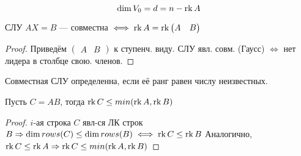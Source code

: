 \begin{consequence}
\[
\dim V_0 = d = n - \operatorname{rk} A
\]
\end{consequence}
\begin{theorem}
  СЛУ $AX = B$ --- совместна $\iff \operatorname{rk} A = \operatorname{rk} \begin{pmatrix} A & B \end{pmatrix}$
\end{theorem}
\begin{proof}
  Приведём $\begin{pmatrix} A & B \end{pmatrix}$ к ступенч. виду. СЛУ явл. совм. (Гаусс) $\iff$ нет лидера в столбце свою. членов.
\end{proof}
\begin{theorem}
  Совместная СЛУ определенна, если её ранг равен числу неизвестных.

\end{theorem}
\begin{theorem}
Пусть $C = AB$, тогда $\operatorname{rk} C \leq min(\operatorname{rk} A, \operatorname{rk} B)$
\end{theorem}
\begin{proof}
$i$-ая строка $C$ явл-ся ЛК строк $B \Rightarrow \dim rows(C) \leq \dim rows(B) \iff \operatorname{rk} C \leq \operatorname{rk} B
$
Аналогично, $\operatorname{rk} C \leq \operatorname{rk} A \Rightarrow \operatorname{rk} C \leq min(\operatorname{rk} A, \operatorname{rk} B)$

\end{proof}
